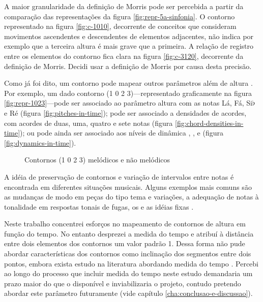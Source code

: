 A maior granularidade da definição de Morris pode ser percebida a
partir da comparação das representações da figura
\ref{fig:repr-5a-sinfonia}. O contorno representado na figura
\ref{fig:c-1010}, decorrente de conceitos que consideram movimentos
ascendentes e descendentes de elementos adjacentes, não indica por
exemplo que a terceira altura é mais grave que a primeira. A relação
de registro entre os elementos do contorno fica clara na figura
\ref{fig:c-3120}, decorrente da definição de Morris. Decidi usar a
definição de Morris por causa desta precisão.

Como já foi dito, um contorno pode mapear outros parâmetros além de
altura \cite[p. 206]{morris93:directions}
\cite[p. 22]{clifford95:contour}. Por exemplo, um dado contorno (1 0 2
3)---representado graficamente na figura \ref{fig:repr-1023}---pode
ser associado ao parâmetro altura com as notas Lá, Fá, Si$\flat$ e Ré
(figura \ref{fig:pitches-in-time}); pode ser associado a densidades de
acordes, com acordes de duas, uma, quatro e sete notas (figura
\ref{fig:chord-densities-in-time}); ou pode ainda ser associado aos
níveis de dinâmica , ,  e 
(figura \ref{fig:dynamics-in-time}).

\begin{figure}
  \centering

  \caption{Contornos (1 0 2 3) melódicos e não melódicos}
  \label{fig:non-melodic-contours}
\end{figure}

A idéia de preservação de contornos e variação de intervalos entre
notas é encontrada em diferentes situações musicais. Alguns exemplos
mais comuns são as mudanças de modo em peças do tipo tema e variações,
a adequação de notas à tonalidade em respostas tonais de fugas, os
 e as idéias fixas \cite[p. 29]{morris87:composition}.

Neste trabalho concentrei esforços no mapeamento de contornos de
altura em função do tempo. No entanto desprezei a medida do tempo e
atribuí à distância entre dois elementos dos contornos um valor padrão
1. Dessa forma não pude abordar características dos contornos como
inclinação dos segmentos entre dois pontos, embora exista estudo na
literatura abordando medida do tempo \cite{beard03:contour}. Percebi
ao longo do processo que incluir medida do tempo neste estudo
demandaria um prazo maior do que o disponível e inviabilizaria o
projeto, contudo pretendo abordar este parâmetro futuramente (vide
capítulo \ref{cha:conclusao-e-discussao}).

